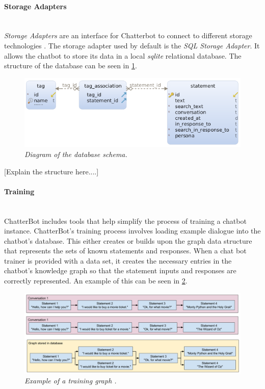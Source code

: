 \documentclass[12pt,a4paper]{article}
\newcommand{\myparagraph}[1]{\paragraph{#1}\mbox{}\\}
\newcommand{\captionstyle}[1] {
    \small{\textit{#1}}
}
\begin{document}
\myparagraph{Storage Adapters}
\textit{Storage Adapters} are an interface for Chatterbot to connect to different storage technologies \cite{Chatterbot:online}. The storage adapter used by default is the \textit{SQL Storage Adapter}. It allows the chatbot to store its data in a local \textit{sqlite} relational database. The structure of the database can be seen in \cref{fig:db-schema}.

\begin{figure}[!htb]%
    \centering
    \includegraphics[width=0.9\columnwidth]{db-schema}%
    \caption{\captionstyle{Diagram of the database schema.}}%
    \label{fig:db-schema}%
\end{figure}

[Explain the structure here....]

\myparagraph{Training}
ChatterBot includes tools that help simplify the process of training a chatbot instance. ChatterBot’s training process involves loading example dialogue into the chatbot’s database. This either creates or builds upon the graph data structure that represents the sets of known statements and responses. When a chat bot trainer is provided with a data set, it creates the necessary entries in the chatbot’s knowledge graph so that the statement inputs and responses are correctly represented. An example of this can be seen in \cref{fig:training-graph}.

\begin{figure}[!htb]%
    \centering
    \includegraphics[width=1.0\columnwidth]{training-graph}%
    \caption{\captionstyle{Example of a training graph \cite{Chatterbot:online}.}}%
    \label{fig:training-graph}%
\end{figure}
\end{document}
